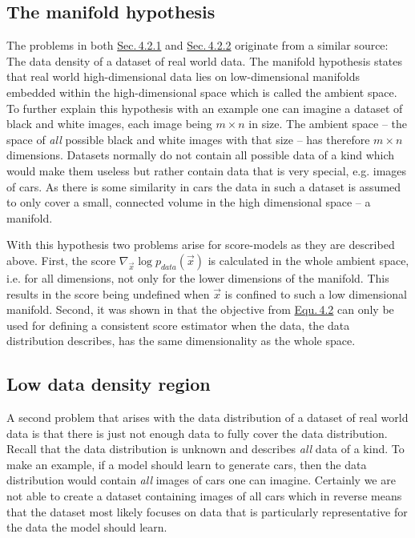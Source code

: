 \subsection{The manifold hypothesis} \label{sec:4.2.1}
The problems in both \hyperref[sec:4.2.1]{Sec.\,4.2.1} and \hyperref[sec:4.2.2]{Sec.\,4.2.2} originate from a similar source: The data density of a dataset of real world data. The manifold hypothesis states that real world high-dimensional data lies on low-dimensional manifolds embedded within the high-dimensional space which is called the ambient space. To further explain this hypothesis with an example one can imagine a dataset of black and white images, each image being $m\times n$ in size. The ambient space – the space of \textit{all} possible black and white images with that size – has therefore $m\times n$ dimensions. Datasets normally do not contain all possible data of a kind which would make them useless but rather contain data that is very special, e.g. images of cars. As there is some similarity in cars the data in such a dataset is assumed to only cover a small, connected volume in the high dimensional space – a manifold. 

With this hypothesis two problems arise for score-models as they are described above. First, the score $\nabla_{\vec{x}}\log p_{data}(\vec{x})$ is calculated in the whole ambient space, i.e. for all dimensions, not only for the lower dimensions of the manifold. This results in the score being undefined when $\vec{x}$ is confined to such a low dimensional manifold. Second, it was shown in \cite{score_matching_original} that the objective from \hyperref[equ:4.2]{Equ.\,4.2} can only be used for defining a consistent score estimator when the data, the data distribution describes, has the same dimensionality as the whole space.
%
\subsection{Low data density region}\label{sec:4.2.2}
A second problem that arises with the data distribution of a dataset of real world data is that there is just not enough data to fully cover the data distribution. Recall that the data distribution is unknown and describes \textit{all} data of a kind. To make an example, if a model should learn to generate cars, then the data distribution would contain \textit{all} images of cars one can imagine. Certainly we are not able to create a dataset containing images of all cars which in reverse means that the dataset most likely focuses on data that is particularly representative for the data the model should learn.

